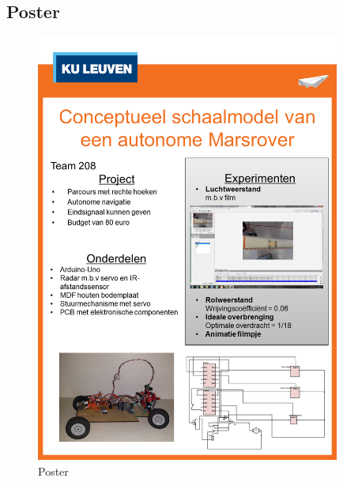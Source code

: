 \subsection{Poster}
\label{bijlage:poster}

\begin{figure}[here]
\center
 \includegraphics[width=10cm]{bijlagen/poster/poster.png}
 \caption{Poster}
 \label{image:poster}
\end{figure}

